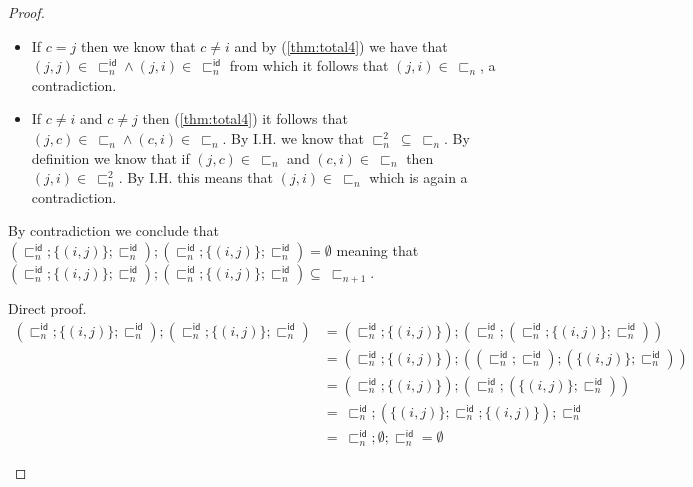 \begin{lem}
{\begin{proof}
\begin{enumerate}[label=\alph*)]
\begin{itemize}
				\item If $c = j$ then we know that $c \neq i$ and by (\ref{thm:total4}) we have that $(j, j) \in\ \sqsubset_n^\mathsf{id} \land (j, i) \in\ \sqsubset_n^\mathsf{id}$ from which it follows that $(j, i) \in\ \sqsubset_n$, a contradiction.
				\item If $c \neq i$ and $c \neq j$ then (\ref{thm:total4}) it follows that $(j, c) \in\ \sqsubset_n \land (c, i) \in\ \sqsubset_n$. By I.H. we know that $\sqsubset_n^2\ \subseteq\ \sqsubset_n$. By definition we know that if $(j, c) \in\ \sqsubset_n$ and $(c, i) \in\ \sqsubset_n$ then $(j, i) \in\ \sqsubset_n^2$. By I.H. this means that $(j, i) \in\ \sqsubset_n$ which is again a contradiction.
			\end{itemize}
			By contradiction we conclude that $\left( \sqsubset_n^\mathsf{id} ; \{ (i, j) \} ; \sqsubset_n^\mathsf{id} \right) ; \left( \sqsubset_n^\mathsf{id} ; \{ (i, j) \} ; \sqsubset_n^\mathsf{id} \right) = \emptyset$ meaning that $\left( \sqsubset_n^\mathsf{id} ; \{ (i, j) \} ; \sqsubset_n^\mathsf{id} \right) ; \left( \sqsubset_n^\mathsf{id} ; \{ (i, j) \} ; \sqsubset_n^\mathsf{id} \right) \subseteq\ \sqsubset_{n + 1}$.
			
			Direct proof.
			\fi
			\begin{align*}
				\left( \sqsubset_n^\mathsf{id} ; \{ (i, j) \} ; \sqsubset_n^\mathsf{id} \right) ; \left( \sqsubset_n^\mathsf{id} ; \{ (i, j) \} ; \sqsubset_n^\mathsf{id} \right)
					&=
				\left( \sqsubset_n^\mathsf{id} ; \{ (i, j) \} \right) ; \left( \sqsubset_n^\mathsf{id} ; \left( \sqsubset_n^\mathsf{id} ; \{ (i, j) \} ; \sqsubset_n^\mathsf{id} \right) \right) \\
					&=
				\left( \sqsubset_n^\mathsf{id} ; \{ (i, j) \} \right) ; \left( \left( \sqsubset_n^\mathsf{id} ;  \sqsubset_n^\mathsf{id} \right) ; \left( \{ (i, j) \} ; \sqsubset_n^\mathsf{id} \right) \right) \\
					&=
				\left( \sqsubset_n^\mathsf{id} ; \{ (i, j) \} \right) ; \left( \sqsubset_n^\mathsf{id} ; \left( \{ (i, j) \} ; \sqsubset_n^\mathsf{id} \right) \right) \\
					&=\
				\sqsubset_n^\mathsf{id} ; \left( \{ (i, j) \} ; \sqsubset_n^\mathsf{id} ; \{ (i, j) \} \right) ; \sqsubset_n^\mathsf{id} \\
					&=\
				\sqsubset_n^\mathsf{id} ; \emptyset ; \sqsubset_n^\mathsf{id} = \emptyset
			\end{align*}
	\end{enumerate}
	\end{proof}
	}
\end{lem}